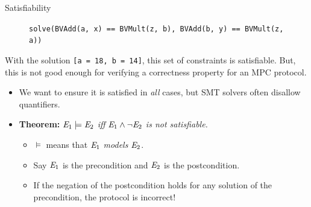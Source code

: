 \documentclass{beamer}
\begin{document}
\begin{frame}{Satisfiability}
    \begin{figure}
        \begin{center}
    {\footnotesize{\texttt{solve(BVAdd(a, x) == BVMult(z, b), BVAdd(b, y) == BVMult(z, a))}}}
        \end{center}
    \end{figure}
    With the solution \texttt{[a = 18, b = 14]}, this set of constraints is satisfiable. But, this is not good enough for verifying a correctness property for an MPC protocol.
    \begin{itemize}
        \item We want to ensure it is satisfied in \textit{all} cases, but SMT solvers often disallow quantifiers.
    \item 
        \textbf{Theorem: }$\mathit{E}_1 \models \mathit{E}_2$ \textit{iff} $\mathit{E}_1 \wedge \neg\mathit{E}_2$ \textit{is not satisfiable.}
        \begin{itemize}
            \item $\models$ means that $\mathit{E}_1$ \textit{models} $\mathit{E}_2$.
            \item Say $\mathit{E}_1$ is the precondition and $\mathit{E}_2$ is the postcondition.
            \item If the negation of the postcondition holds for any solution of the precondition, the protocol is incorrect!
        \end{itemize}
    \end{itemize}
\end{frame}
\end{document}
